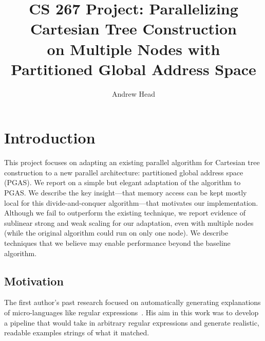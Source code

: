 \documentclass[10pt]{article}
\begin{document}
\title{\Large CS 267 Project: Parallelizing Cartesian Tree Construction \\ 
on Multiple Nodes with Partitioned Global Address Space}
\author{\large Andrew Head}
\date{}
\maketitle

\titleformat{\section}{\normalfont\fontsize{10}{11}\bfseries}{\thesection}{1em}{}


\vspace{-5ex}

\section{Introduction}

This project focuses on adapting an existing parallel algorithm for Cartesian tree construction to
a new parallel architecture: partitioned global address space (PGAS).
We report on a simple but elegant adaptation of the algorithm to PGAS\@.
We describe the key insight---that memory access can be kept mostly local for this
divide-and-conquer algorithm---that motivates our implementation.
Although we fail to outperform the existing technique, we report evidence of sublinear strong and
weak scaling for our adaptation, even with multiple nodes (while the original algorithm could run
on only one node).
We describe techniques that we believe may enable performance beyond the baseline algorithm.

\subsection{Motivation}

The first author's past research focused on automatically generating explanations of
micro-languages like regular expressions~\cite{head_tutorons_2015}.
His aim in this work was to develop a pipeline that would take in arbitrary regular expressions and generate
realistic, readable examples strings of what it matched.
\end{document}
